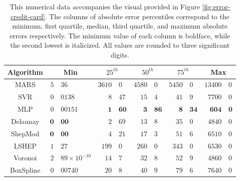 \documentclass[smallextended,final]{svjour3}  %
\begin{document}
\begin{appendix}
\begin{table}
  \centering
  \begin{tabular}{c|r@{.}l|r@{.}l|r@{.}l|r@{.}l|r@{.}l}
    \hline
    Algorithm & \multicolumn{2}{c|}{Min} & \multicolumn{2}{c|}{$25^{th}$} & \multicolumn{2}{c|}{$50^{th}$} & \multicolumn{2}{c|}{$75^{th}$} & \multicolumn{2}{c}{Max}\\
    \hline
    MARS & $5$&$36$ & $3610$&$0$ & $4580$&$0$ & $5450$&$0$ & $13400$&$0$\\
    SVR & $0$&$0138$ & $8$&$47$ & $15$&$4$ & $41$&$9$ & $7700$&$0$\\
    MLP & $0$&$00151$ & $\mathbf{1}$&$\mathbf{60}$ & $\mathbf{3}$&$\mathbf{86}$ & $\mathbf{8}$&$\mathbf{34}$ & $\mathbf{604}$&$\mathbf{0}$\\
    Delaunay & $\mathbf{0}$&$\mathbf{00}$ & $\mathit{2}$&$\mathit{69}$ & $\mathit{13}$&$\mathit{8}$ & $\mathit{35}$&$\mathit{0}$ & $\mathit{4840}$&$\mathit{0}$\\
    ShepMod & $\mathbf{0}$&$\mathbf{00}$ & $4$&$21$ & $17$&$3$ & $51$&$6$ & $6510$&$0$\\
    LSHEP & $1$&$27$ & $199$&$0$ & $260$&$0$ & $343$&$0$ & $6530$&$0$\\
    Voronoi & $\mathit{2}$&$\mathit{89 \times 10^{-10}}$ & $14$&$7$ & $32$&$8$ & $52$&$9$ & $4860$&$0$\\
    BoxSpline & $0$&$00740$ & $20$&$8$ & $40$&$9$ & $79$&$6$ & $7640$&$0$\\
    \hline
  \end{tabular}
  \caption{This numerical data accompanies the visual provided in
    Figure \ref{fig:error-credit-card}. The columns of absolute error
    percentiles correspond to the minimum, first quartile, median,
    third quartile, and maximum absolute errors respectively. The
    minimum value of each column is boldface, while the second lowest
    is italicized. All values are rounded to three significant
    digits.}
  \label{table:error-credit-card}
\end{table}


\end{appendix}
\end{document}

